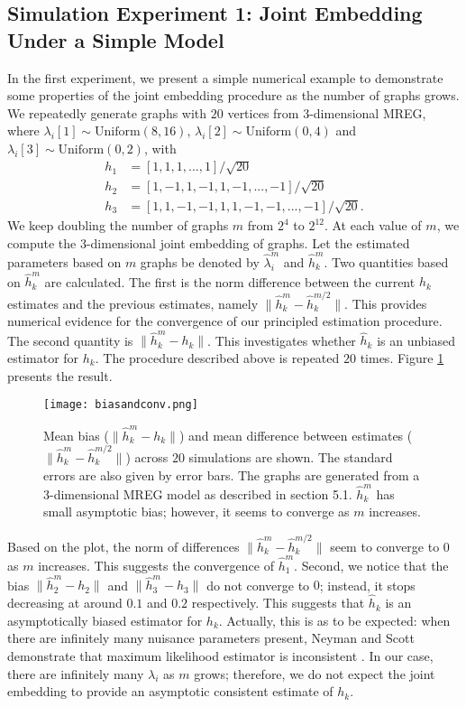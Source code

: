 \documentclass[10pt,journal,compsoc]{IEEEtran}
\begin{document}
\subsection{Simulation Experiment 1: Joint Embedding Under a Simple Model}
\noindent In the first experiment, we present a simple numerical example to demonstrate some properties
of the joint embedding procedure as the number of graphs grows. We repeatedly generate graphs with $20$ vertices from $3$-dimensional MREG, where  $\lambda_i[1] \sim \text{Uniform}(8,16)$, $\lambda_i[2] \sim \text{Uniform}(0,4)$ and $\lambda_i[3] \sim \text{Uniform}(0,2)$,  with
\begin{align*}
 h_1 &=[1,1,1,...,1]/\sqrt{20}  \\
 h_2&=[1,-1,1,-1,1,-1,...,-1] /\sqrt{20}  \\
 h_3&=[1,1,-1,-1,1,1,-1,-1,...,-1]/\sqrt{20}. 
\end{align*}
 We keep doubling the number of graphs $m$ from $2^4$ to $2^{12}$. At each value of $m$, we compute the $3$-dimensional joint embedding of graphs. Let the estimated parameters based on $m$ graphs be denoted by $\hat{\lambda}_i^m$ and $\hat{h}_k^m$. Two quantities based on $\hat{h}_k^m$ are calculated. The first is the norm difference between the current $h_k$ estimates and the previous estimates, namely $\|\hat{h}_k^m-\hat{h}_k^{m/2}\|$. This provides numerical evidence for the convergence of our principled estimation procedure. The second quantity is $\|\hat{h}^m_k-h_k\|$. This investigates whether $\hat{h}_k$ is an unbiased estimator for $h_k$. The procedure described above is repeated $20$ times. Figure \ref{fig:db} presents the result. \\
\begin{figure}[!htbp]
	\centering
	\texttt{[image: biasandconv.png]}
	\caption{Mean bias ($\|\hat{h}^m_k-h_k\|$) and mean difference between estimates ($\|\hat{h}_k^m-\hat{h}_k^{m/2}\|$) across $20$ simulations are shown. The standard errors are also given by error bars. The graphs are generated from a $3$-dimensional MREG model as described in section 5.1. $\hat{h}_k^m$ has small asymptotic bias; however, it seems to converge as $m$ increases.}
	\label{fig:db}
\end{figure}

\noindent Based on the plot, the norm of differences $\|\hat{h}^m_k-\hat{h}_k^{m/2}\|$ seem to converge to $0$ as $m$ increases. This suggests the convergence of $\hat{h}_1^m$. Second, we notice that the bias $\|\hat{h}^m_2-h_2\|$ and $\|\hat{h}^m_3-h_3\|$ do not converge to $0$; instead, it stops decreasing at around $0.1$ and $0.2$ respectively. This suggests that $\hat{h}_k$ is an asymptotically biased estimator for $h_k$. Actually, this is as to be expected: when there are infinitely many nuisance parameters present, Neyman and Scott demonstrate that maximum likelihood estimator is inconsistent \cite{neyman1948consistent}. In our case, there are infinitely many $\lambda_i$ as $m$ grows; therefore, we do not expect the joint embedding to provide an asymptotic consistent estimate of $h_k$. \\
\end{document}

